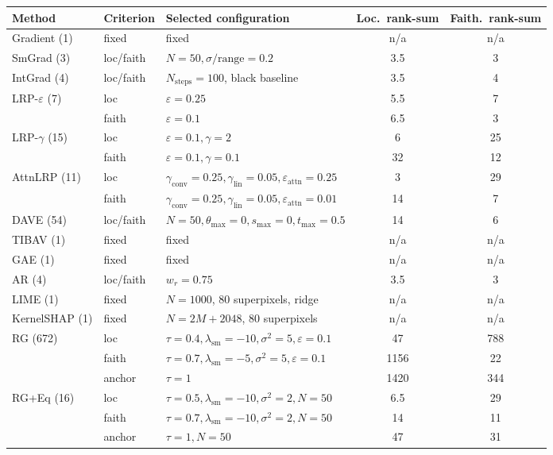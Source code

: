 \begin{tabular}{@{}l l l c c@{}}
\toprule
Method & Criterion & Selected configuration & Loc.\ rank-sum & Faith.\ rank-sum \\
\midrule
Gradient (1) & fixed & fixed & n/a & n/a \\
\addlinespace
SmGrad (3) & loc/faith & $N{=}50,\sigma/\mathrm{range}{=}0.2$ & 3.5 & 3 \\
\addlinespace
IntGrad (4) & loc/faith & $N_{\mathrm{steps}}{=}100$, black baseline & 3.5 & 4 \\
\addlinespace
LRP-$\varepsilon$ (7) & loc & $\varepsilon{=}0.25$ & 5.5 & 7 \\
 & faith & $\varepsilon{=}0.1$ & 6.5 & 3 \\
\addlinespace
LRP-$\gamma$ (15) & loc & $\varepsilon{=}0.1,\gamma{=}2$ & 6 & 25 \\
 & faith & $\varepsilon{=}0.1,\gamma{=}0.1$ & 32 & 12 \\
\addlinespace
AttnLRP (11) & loc & $\gamma_{\mathrm{conv}}{=}0.25,\gamma_{\mathrm{lin}}{=}0.05,\varepsilon_{\mathrm{attn}}{=}0.25$ & 3 & 29 \\
 & faith & $\gamma_{\mathrm{conv}}{=}0.25,\gamma_{\mathrm{lin}}{=}0.05,\varepsilon_{\mathrm{attn}}{=}0.01$ & 14 & 7 \\
\addlinespace
DAVE (54) & loc/faith & $N{=}50,\theta_{\max}{=}0,s_{\max}{=}0,t_{\max}{=}0.5$ & 14 & 6 \\
\addlinespace
TIBAV (1) & fixed & fixed & n/a & n/a \\
\addlinespace
GAE (1) & fixed & fixed & n/a & n/a \\
\addlinespace
AR (4) & loc/faith & $w_r{=}0.75$ & 3.5 & 3 \\
\addlinespace
LIME (1) & fixed & $N{=}1000$, 80 superpixels, ridge & n/a & n/a \\
\addlinespace
KernelSHAP (1) & fixed & $N{=}2M{+}2048$, 80 superpixels & n/a & n/a \\
\addlinespace
RG (672) & loc & $\tau{=}0.4,\lambda_{\mathrm{sm}}{=}{-}10,\sigma^2{=}5,\varepsilon{=}0.1$ & 47 & 788 \\
 & faith & $\tau{=}0.7,\lambda_{\mathrm{sm}}{=}{-}5,\sigma^2{=}5,\varepsilon{=}0.1$ & 1156 & 22 \\
 & anchor & $\tau{=}1$ & 1420 & 344 \\
\addlinespace
RG+Eq (16) & loc & $\tau{=}0.5,\lambda_{\mathrm{sm}}{=}{-}10,\sigma^2{=}2,N{=}50$ & 6.5 & 29 \\
 & faith & $\tau{=}0.7,\lambda_{\mathrm{sm}}{=}{-}10,\sigma^2{=}2,N{=}50$ & 14 & 11 \\
 & anchor & $\tau{=}1,N{=}50$ & 47 & 31 \\
\bottomrule
\end{tabular}
